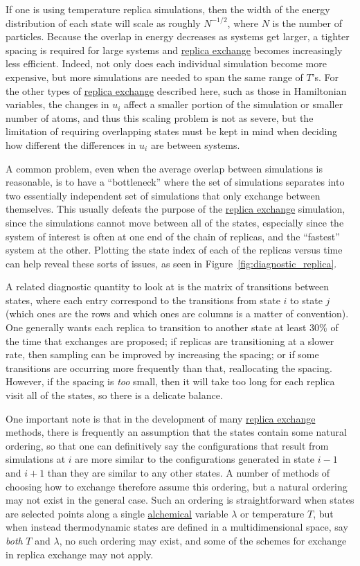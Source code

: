 \documentclass[9pt,review]{livecoms}
\begin{document}
If one is using temperature replica simulations, then the width of the energy distribution of each state will scale as roughly $N^{-1/2}$, where $N$ is the number of particles. Because the overlap in energy decreases as systems get larger, a tighter spacing is required for large systems and \hyperlink{ref:ReplEx} {replica exchange} becomes increasingly less efficient. Indeed, not only does each individual simulation become more expensive, but more simulations are needed to span the same range of $T$'s. For the other types of \hyperlink{ref:ReplEx} {replica exchange} described here, such as those in Hamiltonian variables, the changes in $u_i$ affect a smaller portion of the simulation or smaller number of atoms, and thus this scaling problem is not as severe, but the limitation of requiring overlapping states must be kept in mind when deciding how different the differences in $u_i$ are between systems.

A common problem, even when the average overlap between simulations is reasonable, is to have a ``bottleneck'' where the set of simulations separates into two essentially independent set of simulations that only exchange between themselves. This usually defeats the purpose of the \hyperlink{ref:ReplEx} {replica exchange} simulation, since the simulations cannot move between all of the states, especially since the system of interest is often at one end of the chain of replicas, and the ``fastest'' system at the other. Plotting the state index of each of the replicas versus time can help reveal these sorts of issues, as seen in Figure~\ref{fig:diagnostic_replica}.


A related diagnostic quantity to look at is the matrix of transitions between states, where each entry correspond to the transitions from state $i$ to state $j$ (which ones are the rows and which ones are columns is a matter of convention).  One generally wants each replica to transition to another state at least 30\% of the time that exchanges are proposed; if replicas are transitioning at a slower rate, then sampling can be improved by increasing the spacing; or if some transitions are occurring more frequently than that, reallocating the spacing. However, if the spacing is \textit{too} small, then it will take too long for each replica visit all of the states, so there is a delicate balance.

One important note is that in the development of many \hyperlink{ref:ReplEx} {replica exchange} methods, there is frequently an assumption that the states contain some natural ordering, so that one can definitively say the configurations that result from simulations at $i$ are more similar to the configurations generated in state $i-1$ and $i+1$ than they are similar to any other states.  A number of methods of choosing how to exchange therefore assume this ordering, but a natural ordering may not exist in the general case.  Such an ordering is straightforward when states are selected points along a single \hyperlink{ref:Alchemical} {alchemical} variable $\lambda$ or temperature $T$, but when instead thermodynamic states are defined in a multidimensional space, say \emph{both} $T$ and $\lambda$, no such ordering may exist, and some of the schemes for exchange in replica exchange may not apply.
\end{document}
